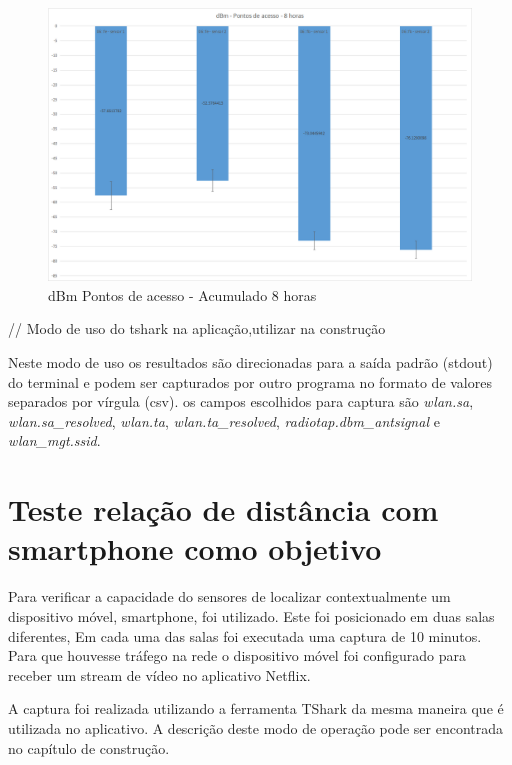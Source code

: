 \begin{figure}[htb]
	\caption{\label{fig-graf-8horas}dBm Pontos de acesso - Acumulado 8 horas}
	\begin{center}
		\includegraphics[width=1\textwidth]{060-testes/data-analisis/night-run/dBm-Pontos_de_acesso-8horas.png}
	\end{center}
\end{figure}


// Modo de uso do tshark na aplicação,utilizar na construção

Neste modo de uso os resultados são direcionadas para a saída padrão
(stdout)  do terminal e podem ser capturados por outro programa no formato
de valores separados por vírgula (csv).  os campos escolhidos para captura
são \emph{wlan.sa}, \emph{wlan.sa\_resolved}, \emph{wlan.ta},
\emph{wlan.ta\_resolved}, \emph{radiotap.dbm\_antsignal} e \emph{wlan\_mgt.ssid}.


\section{Teste relação de distância com smartphone como objetivo}


Para verificar a capacidade do sensores de localizar contextualmente um dispositivo
móvel, smartphone, foi utilizado. Este foi posicionado em duas salas diferentes, Em
cada uma das salas foi executada uma captura de 10 minutos. Para que houvesse tráfego
na rede o dispositivo móvel foi configurado para receber um stream de vídeo no aplicativo Netflix.

A captura foi realizada utilizando a ferramenta TShark da mesma maneira que é utilizada no
aplicativo. A descrição deste modo de operação pode ser encontrada no capítulo de construção.

